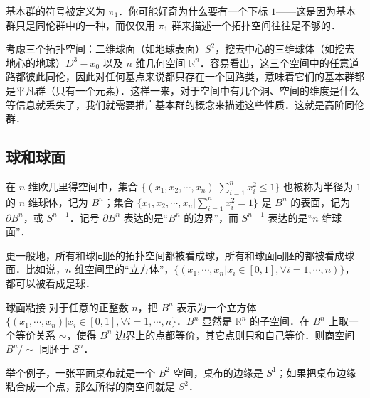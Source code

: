 
\begin{issues}
\issueDraft
\end{issues}





基本群的符号被定义为 $\pi_1$．你可能好奇为什么要有一个下标 $1$——这是因为基本群只是同伦群中的一种，而仅仅用 $\pi_1$ 群来描述一个拓扑空间往往是不够的．

考虑三个拓扑空间：二维球面（如地球表面）$S^2$，挖去中心的三维球体（如挖去地心的地球）$D^3-x_0$ 以及 $n$ 维几何空间 $\mathbb{R}^n$．容易看出，这三个空间中的任意道路都彼此同伦，因此对任何基点来说都只存在一个回路类，意味着它们的基本群都是平凡群（只有一个元素）．这样一来，对于空间中有几个洞、空间的维度是什么等信息就丢失了，我们就需要推广基本群的概念来描述这些性质．这就是高阶同伦群．

\subsection{球和球面}
在 $n$ 维欧几里得空间中，集合 $\{(x_1, x_2,\cdots,x_n)|\sum^n_{i=1}x_i^2\leq 1\}$ 也被称为半径为 $1$ 的 $n$ 维球体，记为 $B^n$；集合 $\{x_1, x_2, \cdots, x_n|\sum^n_{i=1}x_i^2=1\}$ 是 $B^n$ 的表面，记为 $\partial B^n$，或 $S^{n-1}$．记号 $\partial B^n$ 表达的是“$B^n$ 的边界”，而 $S^{n-1}$ 表达的是“$n$ 维球面”．

更一般地，所有和球同胚的拓扑空间都被看成球，所有和球面同胚的都被看成球面．比如说，$n$ 维空间里的“立方体”，$\{(x_1, \cdots, x_n|x_i\in[0, 1], \forall i=1, \cdots, n)\}$，都可以被看成是球．

\begin{theorem}{球面粘接}
对于任意的正整数 $n$，把 $B^n$ 表示为一个立方体 $\{(x_1, \cdots, x_n)|x_i\in[0, 1], \forall i=1, \cdots, n\}$．$B^n$ 显然是 $\mathbb{R}^n$ 的子空间．在 $B^n$ 上取一个等价关系 $\sim$，使得 $B^n$ 边界上的点都等价，其它点则只和自己等价．则商空间 $B^n/\sim$ 同胚于 $S^n$．
\end{theorem}

举个例子，一张平面桌布就是一个 $B^2$ 空间，桌布的边缘是 $S^1$；如果把桌布边缘粘合成一个点，那么所得的商空间就是 $S^2$．

